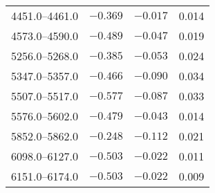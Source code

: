 \documentclass{aa}
\begin{document}
\begin{appendix}
\begin{table}
{\begin{tabular}{lccc}
4451.0--4461.0 & $-0.369$ & $-0.017$ & 0.014\\
4573.0--4590.0 & $-0.489$ & $-0.047$ & 0.019\\
5256.0--5268.0 & $-0.385$ & $-0.053$ & 0.024\\
5347.0--5357.0 & $-0.466$ & $-0.090$ & 0.034\\
5507.0--5517.0 & $-0.577$ & $-0.087$ & 0.033\\
5576.0--5602.0 & $-0.479$ & $-0.043$ & 0.014\\
5852.0--5862.0 & $-0.248$ & $-0.112$ & 0.021\\
6098.0--6127.0 & $-0.503$ & $-0.022$ & 0.011\\
6151.0--6174.0 & $-0.503$ & $-0.022$ & 0.009\\
\hline
\end{tabular}
}
\end{table}


\end{appendix}
\end{document}
